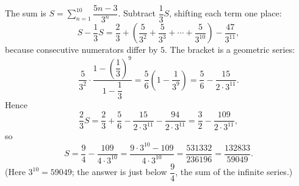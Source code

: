 The sum is $S=\displaystyle\sum_{n=1}^{10}\dfrac{5n-3}{3^n}$. Subtract $\dfrac{1}{3}S$, shifting each term one place:
\[
S-\dfrac{1}{3}S=\dfrac{2}{3}+\left(\dfrac{5}{3^2}+\dfrac{5}{3^3}+\cdots+\dfrac{5}{3^{10}}\right)-\dfrac{47}{3^{11}} ,
\]
because consecutive numerators differ by $5$. The bracket is a geometric series:
\[
\dfrac{5}{3^2}\cdot\dfrac{1-\left(\dfrac{1}{3}\right)^9}{1-\dfrac{1}{3}}=\dfrac{5}{6}\left(1-\dfrac{1}{3^9}\right)=\dfrac{5}{6}-\dfrac{15}{2\cdot3^{11}} .
\]
Hence
\[
\dfrac{2}{3}S=\dfrac{2}{3}+\dfrac{5}{6}-\dfrac{15}{2\cdot3^{11}}-\dfrac{94}{2\cdot3^{11}}=\dfrac{3}{2}-\dfrac{109}{2\cdot3^{11}},
\]
so
\[
S=\dfrac{9}{4}-\dfrac{109}{4\cdot3^{10}}=\dfrac{9\cdot3^{10}-109}{4\cdot3^{10}}=\dfrac{531332}{236196}=\boxed{\dfrac{132833}{59049}} .
\]
(Here $3^{10}=59049$; the answer is just below $\dfrac{9}{4}$, the sum of the infinite series.)
